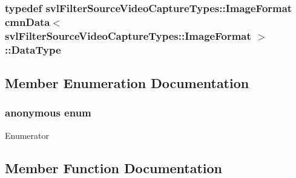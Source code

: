 \subsubsection[{Data\+Type}]{\setlength{\rightskip}{0pt plus 5cm}typedef {\bf svl\+Filter\+Source\+Video\+Capture\+Types\+::\+Image\+Format} {\bf cmn\+Data}$<$ {\bf svl\+Filter\+Source\+Video\+Capture\+Types\+::\+Image\+Format} $>$\+::{\bf Data\+Type}}\label{classcmn_data_3_01svl_filter_source_video_capture_types_1_1_image_format_01_4_addfc3b80307fd56e73fbbf1f6eb63edb}


\subsection{Member Enumeration Documentation}
\hypertarget{classcmn_data_3_01svl_filter_source_video_capture_types_1_1_image_format_01_4_a33a5cfeab99bc16509a0c2f8a0b7218d}{}\subsubsection[{anonymous enum}]{\setlength{\rightskip}{0pt plus 5cm}anonymous enum}\label{classcmn_data_3_01svl_filter_source_video_capture_types_1_1_image_format_01_4_a33a5cfeab99bc16509a0c2f8a0b7218d}
\begin{Desc}
\item[Enumerator]\par
\begin{description}
\item[{\em 
\hypertarget{classcmn_data_3_01svl_filter_source_video_capture_types_1_1_image_format_01_4_a33a5cfeab99bc16509a0c2f8a0b7218dabf991dde75ea0e092b74b6405ec0e683}{}I\+S\+\_\+\+S\+P\+E\+C\+I\+A\+L\+I\+Z\+E\+D\label{classcmn_data_3_01svl_filter_source_video_capture_types_1_1_image_format_01_4_a33a5cfeab99bc16509a0c2f8a0b7218dabf991dde75ea0e092b74b6405ec0e683}
}]\end{description}
\end{Desc}


\subsection{Member Function Documentation}
\hypertarget{classcmn_data_3_01svl_filter_source_video_capture_types_1_1_image_format_01_4_ab8d567cf07470e47faac3a45b6d8a358}{}

